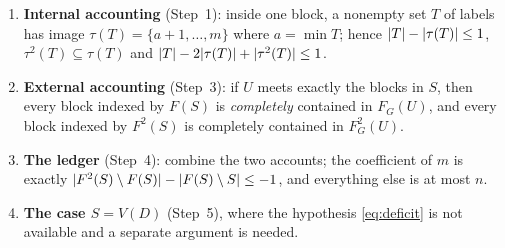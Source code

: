 

\begin{planbox}
\begin{enumerate}[leftmargin=1.3em,itemsep=1pt,topsep=1pt]
\item \textbf{Internal accounting} (Step~1): inside one block, a nonempty set $T$ of
  labels has image $\tau(T)=\{a+1,\dots,m\}$ where $a=\min T$; hence $\lvert T\rvert-\lvert \tau(T)\rvert\le1$,
  $\tau^2(T)\subseteq\tau(T)$ and $\lvert T\rvert-2\lvert \tau(T)\rvert+\lvert \tau^2(T)\rvert\le1$.
\item \textbf{External accounting} (Step~3): if $U$ meets exactly the blocks in $S$, then
  every block indexed by $F(S)$ is \emph{completely} contained in $F_G(U)$, and every block
  indexed by $F^2(S)$ is completely contained in $F_G^2(U)$.
\item \textbf{The ledger} (Step~4): combine the two accounts; the coefficient of $m$ is
  exactly $\lvert F^2(S)\setminus F(S)\rvert-\lvert F(S)\setminus S\rvert\le-1$, and everything else is at most
  $n$.
\item \textbf{The case $S=V(D)$} (Step~5), where the hypothesis \eqref{eq:deficit} is not
  available and a separate argument is needed.
\end{enumerate}
\end{planbox}

